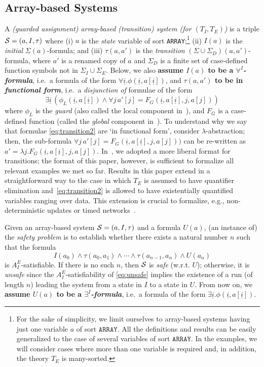 \documentclass{LMCS}
\newcommand{\ui}{\ensuremath{\underline i}}
\newcommand{\cSi}{\ensuremath \mathcal S}
\theoremstyle{plain}\newtheorem{assumption}[thm]{Assumption}
\theoremstyle{plain}\newtheorem{proposition}[thm]{Proposition}
\theoremstyle{plain}\newtheorem{property}[thm]{Property}
\theoremstyle{plain}\newtheorem{example}[thm]{Example}
\theoremstyle{plain}\newtheorem{claim}[thm]{Claim}
\theoremstyle{plain}\newtheorem{lemma}[thm]{Lemma}
\begin{document}
\subsection{Array-based Systems}
\label{subsec:array-based}
A \emph{(guarded assignment) array-based (transition) system (for
  $(T_I,T_E)$)} is a triple $\cSi=(a,I,\tau)$ where (i) $a$ is the
\emph{state} variable of sort \texttt{ARRAY};\footnote{For the sake of
simplicity, we limit ourselves to array-based systems having just
  one variable $a$ of sort $\mathtt{ARRAY}$. All the definitions and
  results can be easily generalized to the case of several variables of
  sort $\mathtt{ARRAY}$.  In the examples, we will consider cases
  where more than one variable is required and, in addition, the
  theory $T_E$ is many-sorted.}  (ii) $I(a)$ is the \emph{initial}
$\Sigma(a)$-formula; and (iii) $\tau(a, a')$ is the \emph{transition}
$(\Sigma\cup \Sigma_D)(a, a')$-formula, where $a'$ is a renamed copy
of $a$ and $\Sigma_D$ is a finite set of case-defined function symbols
not in $\Sigma_I\cup \Sigma_E$.  Below, we also \textbf{assume $I(a)$
  to be a \emph{$\forall^I$-formula}}, i.e.\ a formula of the form
$\forall \ui.\phi(\ui, a[\ui])$, and \textbf{$\tau(a,a')$ to be in
  \emph{functional form}}, i.e.\ a \emph{disjunction of} formulae of
the form
\begin{equation}
  \label{eq:transition2}
  \exists \ui\,(\phi_L(\ui, a[\ui]) \wedge
    \forall j\,a'[j]=F_G(\ui, a[\ui], j, a[j]))
\end{equation}
where $\phi_L$ is the \emph{guard} (also called the local component
in~\cite{ijcar08}), and $F_G$ is a case-defined function (called the
\emph{global} component in~\cite{ijcar08}).  To understand why we say
that formulae \eqref{eq:transition2} are `in functional form',
consider $\lambda$-abstraction; then, the sub-formula $\forall
j\,a'[j]=F_G(\ui, a[\ui], j, a[j]))$ can be re-written as $a'=\lambda
j. F_G(\ui, a[\ui], j, a[j])$.
In~\cite{ijcar08}, we adopted a more liberal format for transitions;
the format of this paper, however, is sufficient to formalize all
relevant examples we met so far. Results in this paper extend in a
straightforward way to the case in which $T_E$ is assumed to have
quantifier elimination and~\eqref{eq:transition2} is allowed to have
existentially quantified variables ranging over data.
This extension is crucial to formalize, e.g., non-deterministic
updates
or timed networks~\cite{verify}.


Given an array-based system $\cSi=(a,I,\tau)$ and a formula $U(a)$,
(an instance of) the \emph{safety problem} is to establish whether
there exists a natural number $n$ such that the formula
\begin{equation}
  \label{eq:unsafe}
  I(a_0)\wedge \tau(a_0, a_1)\wedge \cdots \wedge \tau(a_{n-1}, a_n)\wedge U(a_n)
\end{equation}
is $A^E_I$-satisfiable. If there is no such $n$, then $\cSi$ is
\emph{safe} (w.r.t. $U$); otherwise, it is \emph{unsafe} since the
$A^E_I$-satisfiability of \eqref{eq:unsafe} implies the existence of a
run (of length $n$) leading the system from a state in $I$ to a state
in $U$.  From now on, we \textbf{assume $U(a)$ to be a
  \emph{$\exists^I$-formula}}, i.e.\ a formula of the form $\exists
\ui.\phi(\ui, a[\ui])$.
\end{document}
